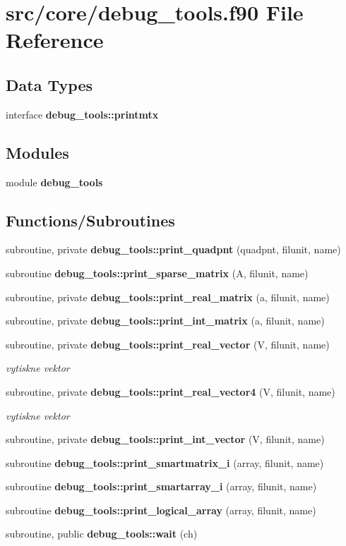\section{src/core/debug\+\_\+tools.f90 File Reference}
\label{debug__tools_8f90}
\subsection*{Data Types}
\begin{DoxyCompactItemize}
\item 
interface {\bf debug\+\_\+tools\+::printmtx}
\end{DoxyCompactItemize}
\subsection*{Modules}
\begin{DoxyCompactItemize}
\item 
module {\bf debug\+\_\+tools}
\end{DoxyCompactItemize}
\subsection*{Functions/\+Subroutines}
\begin{DoxyCompactItemize}
\item 
subroutine, private {\bf debug\+\_\+tools\+::print\+\_\+quadpnt} (quadpnt, filunit, name)
\item 
subroutine {\bf debug\+\_\+tools\+::print\+\_\+sparse\+\_\+matrix} (A, filunit, name)
\item 
subroutine, private {\bf debug\+\_\+tools\+::print\+\_\+real\+\_\+matrix} (a, filunit, name)
\item 
subroutine, private {\bf debug\+\_\+tools\+::print\+\_\+int\+\_\+matrix} (a, filunit, name)
\item 
subroutine, private {\bf debug\+\_\+tools\+::print\+\_\+real\+\_\+vector} (V, filunit, name)
\begin{DoxyCompactList}\small\item\em vytiskne vektor \end{DoxyCompactList}\item 
subroutine, private {\bf debug\+\_\+tools\+::print\+\_\+real\+\_\+vector4} (V, filunit, name)
\begin{DoxyCompactList}\small\item\em vytiskne vektor \end{DoxyCompactList}\item 
subroutine, private {\bf debug\+\_\+tools\+::print\+\_\+int\+\_\+vector} (V, filunit, name)
\item 
subroutine {\bf debug\+\_\+tools\+::print\+\_\+smartmatrix\+\_\+i} (array, filunit, name)
\item 
subroutine {\bf debug\+\_\+tools\+::print\+\_\+smartarray\+\_\+i} (array, filunit, name)
\item 
subroutine {\bf debug\+\_\+tools\+::print\+\_\+logical\+\_\+array} (array, filunit, name)
\item 
subroutine, public {\bf debug\+\_\+tools\+::wait} (ch)
\end{DoxyCompactItemize}
